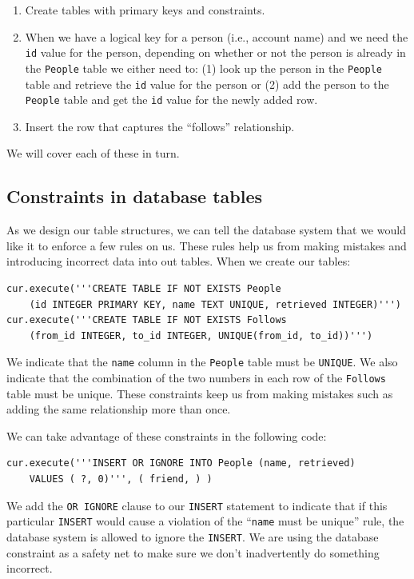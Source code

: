 \begin{enumerate}

\item Create tables with primary keys and constraints.

\item When we have a logical key for a person (i.e., account
name) and we need the {\tt id} value for the person,
depending on whether or not the person is already
in the {\tt People} table we either need to: 
(1) look up the person in the {\tt People} table and 
retrieve the {\tt id} value for the person 
or (2) add the person to the {\tt People} table and get the 
{\tt id} value for the newly added row.

\item Insert the row that captures the ``follows'' relationship.

\end{enumerate}

We will cover each of these in turn.

\subsection{Constraints in database tables}

As we design our table structures, we can tell the database system 
that we would like it to enforce a few rules on us.   These rules
help us from making mistakes and introducing incorrect data into 
out tables.   When we create our tables:

\beforeverb
\begin{verbatim}
cur.execute('''CREATE TABLE IF NOT EXISTS People 
    (id INTEGER PRIMARY KEY, name TEXT UNIQUE, retrieved INTEGER)''')
cur.execute('''CREATE TABLE IF NOT EXISTS Follows 
    (from_id INTEGER, to_id INTEGER, UNIQUE(from_id, to_id))''')
\end{verbatim}
\afterverb
%
We indicate that the {\tt name} column in the {\tt People} table must be
{\tt UNIQUE}.   We also indicate that the combination of the two numbers
in each row of the {\tt Follows} table must be unique.  These constraints
keep us from making mistakes such as adding the same relationship more than
once.

We can take advantage of these constraints in the following code:

\beforeverb
\begin{verbatim}
cur.execute('''INSERT OR IGNORE INTO People (name, retrieved) 
    VALUES ( ?, 0)''', ( friend, ) )
\end{verbatim}
\afterverb
%
We add the {\tt OR IGNORE} clause to our {\tt INSERT} statement to indicate
that if this particular {\tt INSERT} would cause a violation of the
``{\tt name} must be unique'' rule, the database system is allowed to ignore the 
{\tt INSERT}.  We are using the database constraint as a safety net
to make sure we don't inadvertently do something incorrect.

